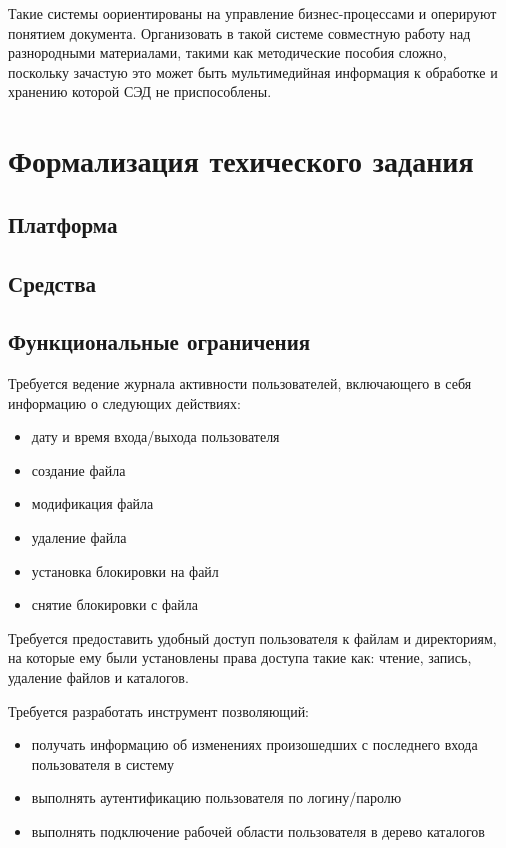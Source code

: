 \documentclass[utf8,usehyperref,12pt]{G7-32}
\begin{document}
Такие системы оориентированы на управление бизнес-процессами и оперируют понятием документа. Организовать в такой системе совместную работу над разнородными материалами, такими как методические пособия сложно, поскольку зачастую это может быть мультимедийная информация к обработке и хранению которой СЭД не приспособлены.

\section{Формализация техического задания}
\subsection{Платформа}
\subsection{Средства}
\subsection{Функциональные ограничения}

Требуется ведение журнала активности пользователей, включающего в себя информацию о следующих действиях: 
\begin{itemize}
\item дату и время входа/выхода пользователя
\item создание файла
\item модификация файла
\item удаление файла
\item установка блокировки на файл
\item снятие блокировки с файла
\end{itemize}

Требуется предоставить удобный доступ пользователя к файлам и директориям, на которые ему были установлены права доступа такие как: чтение, запись, удаление файлов и каталогов.

Требуется разработать инструмент позволяющий:	
\begin{itemize}
\item получать информацию об изменениях произошедших с последнего входа пользователя в систему	
\item выполнять аутентификацию пользователя по логину/паролю	
\item выполнять подключение рабочей области пользователя в дерево каталогов
\end{itemize}
\end{document}
